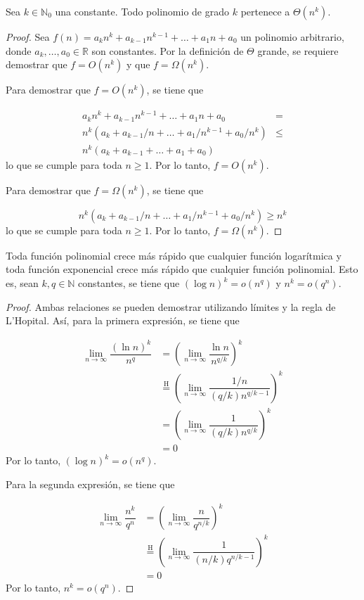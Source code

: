 \begin{thm}
    Sea $k\in\mathbb{N}_{0}$ una constante. Todo polinomio de grado $k$
    pertenece a $\Theta(n^{k})$.
\end{thm}

\begin{proof}
    Sea $f(n)=a_{k}n^{k}+a_{k-1}n^{k-1}+\dots+a_{1}n+a_{0}$ un polinomio
    arbitrario, donde $a_k,\dots,a_{0}\in\mathbb{R}$ son constantes.
    Por la definición de $\Theta$ grande, se requiere demostrar que $f=O(n^{k})$
    y que $f=\Omega(n^{k})$. 
    
    Para demostrar que $f=O(n^{k})$, se tiene que 
    
    \begin{align*}
        a_{k}n^{k}+a_{k-1}n^{k-1}+\dots+a_{1}n+a_{0} &=\\ n^{k}(a_{k}+a_{k-1}/n+\dots+a_{1}/n^{k-1}+a_{0}/n^{k}) &\leq\\
        n^{k}(a_{k}+a_{k-1}+\dots+a_{1}+a_{0})
    \end{align*}
    lo que se cumple para toda $n\geq1$. Por lo tanto, $f=O(n^{k})$.
    
    Para demostrar que $f=\Omega(n^{k})$, se tiene que 
    
    \[
        n^{k}(a_{k}+a_{k-1}/n+\dots+a_{1}/n^{k-1}+a_{0}/n^{k})\geq n^{k}
    \]
    lo que se cumple para toda $n\geq1$. Por lo tanto, $f=\Omega(n^{k})$.
\end{proof}

\begin{thm}
    Toda función polinomial crece más rápido que cualquier función logarítmica y
    toda función exponencial crece más rápido que cualquier función polinomial.
    Esto es, sean $k,q\in\mathbb{N}$ constantes, se tiene que $(\log n)^k=o(n^q)$
    y $n^k=o(q^n)$.
\end{thm}

\begin{proof}
    Ambas relaciones se pueden demostrar utilizando límites y la regla
    de L'Hopital. Así, para la primera expresión, se tiene que
    
    \begin{align*}
        \lim_{n\to\infty}\dfrac{(\ln n)^{k}}{n^{q}} &= \left(\lim_{n\to\infty}\dfrac{\ln n}{n^{q/k}}\right)^{k}\\
        &\overset{\text{H}}{=}\left(\lim_{n\to\infty}\dfrac{1/n}{(q/k)n^{q/k-1}}\right)^{k}\\
        &= \left(\lim_{n\to\infty}\dfrac{1}{(q/k)n^{q/k}}\right)^{k}\\
        &= 0
    \end{align*}
    Por lo tanto, $(\log n)^{k}=o(n^{q})$.
    
    Para la segunda expresión, se tiene que 
    
    \begin{align*}
    \lim_{n\to\infty}\dfrac{n^{k}}{q^{n}} &= \left(\lim_{n\to\infty}\dfrac{n}{q^{n/k}}\right)^{k}\\
    &\overset{\text{H}}{=}\left(\lim_{n\to\infty}\dfrac{1}{(n/k)q^{n/k-1}}\right)^{k}\\
    &= 0
    \end{align*}
    Por lo tanto, $n^{k}=o(q^{n})$.
\end{proof}

